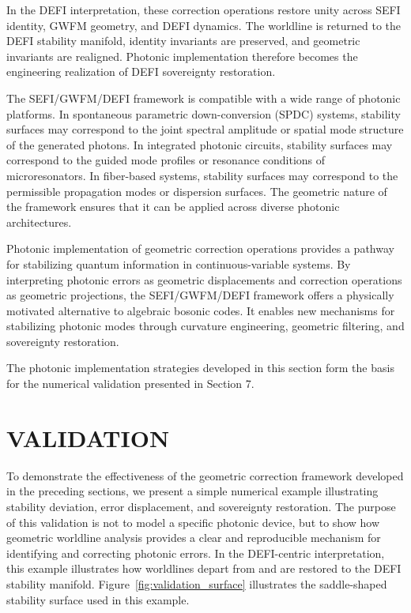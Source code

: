 \documentclass[aip,adv,reprint,floatfix]{revtex4-2}
\begin{document}
In the DEFI interpretation, these correction operations
restore unity across SEFI identity, GWFM geometry, and
DEFI dynamics.\cite{DuttonSEFI2026} The worldline is returned to the DEFI
stability manifold, identity invariants are preserved, and
geometric invariants are realigned. Photonic implementation therefore becomes the engineering realization of
DEFI sovereignty restoration.

The SEFI/GWFM/DEFI framework is compatible
with a wide range of photonic platforms.\cite{DuttonElectronField2026}
In spontaneous
parametric down-conversion (SPDC) systems, stability
surfaces may correspond to the joint spectral amplitude
or spatial mode structure of the generated photons. In
integrated photonic circuits, stability surfaces may correspond to the guided mode profiles or resonance conditions of microresonators. In fiber-based systems, stability
surfaces may correspond to the permissible propagation
modes or dispersion surfaces. The geometric nature of
the framework ensures that it can be applied across diverse photonic architectures.

Photonic implementation of geometric correction operations provides a pathway for stabilizing quantum
information in continuous-variable systems.\cite{DuttonSEFI2026}
By interpreting photonic errors as geometric displacements
and correction operations as geometric projections, the
SEFI/GWFM/DEFI framework offers a physically motivated alternative to algebraic bosonic codes. It enables new mechanisms for stabilizing photonic modes
through curvature engineering, geometric filtering, and
sovereignty restoration.

The photonic implementation strategies developed in
this section form the basis for the numerical validation
presented in Section 7.
\section{VALIDATION}

To demonstrate the effectiveness of the geometric
correction framework developed in the preceding sections, we present a simple numerical example illustrating
stability deviation, error displacement, and sovereignty
restoration.\cite{DuttonElectronField2026,DuttonSEFI2026}
The purpose of this validation is not to
model a specific photonic device, but to show how geometric worldline analysis provides a clear and reproducible mechanism for identifying and correcting photonic errors. In the DEFI-centric interpretation, this example illustrates how worldlines depart from and are restored to the DEFI stability manifold. Figure~\ref{fig:validation_surface}
illustrates the saddle-shaped stability surface used in this example.
\end{document}
